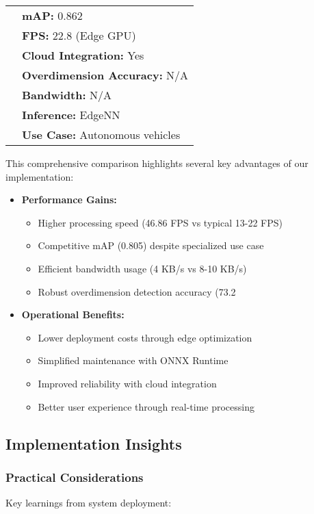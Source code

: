 \begin{table}[htbp]
\begin{tabular}{|l|l|}
    \cline{2-2}
    & \textbf{mAP:} 0.862 \\
    \cline{2-2}
    & \textbf{FPS:} 22.8 (Edge GPU) \\
    \cline{2-2}
    & \textbf{Cloud Integration:} Yes \\
    \cline{2-2}
    & \textbf{Overdimension Accuracy:} N/A \\
    \cline{2-2}
    & \textbf{Bandwidth:} N/A \\
    \cline{2-2}
    & \textbf{Inference:} EdgeNN \\
    \cline{2-2}
    & \textbf{Use Case:} Autonomous vehicles \\
    \hline
  \end{tabular}
\end{table}

This comprehensive comparison highlights several key advantages of our implementation:

\begin{itemize}
  \item \textbf{Performance Gains:}
  \begin{itemize}
    \item Higher processing speed (46.86 FPS vs typical 13-22 FPS)
    \item Competitive mAP (0.805) despite specialized use case
    \item Efficient bandwidth usage (4 KB/s vs 8-10 KB/s)
    \item Robust overdimension detection accuracy (73.2%
  \end{itemize}
  
  \item \textbf{Operational Benefits:}
  \begin{itemize}
    \item Lower deployment costs through edge optimization
    \item Simplified maintenance with ONNX Runtime
    \item Improved reliability with cloud integration
    \item Better user experience through real-time processing
  \end{itemize}
\end{itemize}

\subsection{Implementation Insights}

\subsubsection{Practical Considerations}
Key learnings from system deployment:

